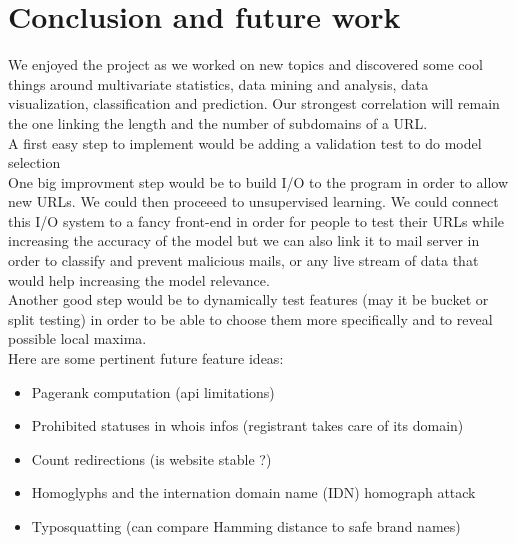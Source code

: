 \documentclass[conference,11pt]{IEEEtran}
\begin{document}
\section{Conclusion and future work}
We enjoyed the project as we worked on new topics and discovered some cool
things around multivariate statistics, data mining and analysis, data
visualization, classification and prediction. Our strongest correlation will
remain the one linking the length and the number of subdomains of a URL. \\
A first easy step to implement would be adding a validation test to do model
selection \cite{validation-set} \\
One big improvment step would be to build I/O to the program in order to allow
new URLs. We could then proceeed to unsupervised learning. We could connect this
I/O system to a fancy front-end in order for people to test their URLs while
increasing the accuracy of the model but we can also link it to mail server in
order to classify and prevent malicious mails, or any live stream of data that
would help increasing the model relevance. \\
Another good step would be to dynamically test features (may it be bucket or
split testing) in order to be able to choose them more specifically and to
reveal possible local maxima. \\

Here are some pertinent future feature ideas:
\begin{itemize}
  \item Pagerank computation (api limitations)
  \item Prohibited statuses in whois infos (registrant takes care of its domain)
  \item Count redirections (is website stable ?)
  \item Homoglyphs and the internation domain name (IDN) homograph attack
  \item Typosquatting (can compare Hamming distance to safe brand names)
\end{itemize}



\end{document}
